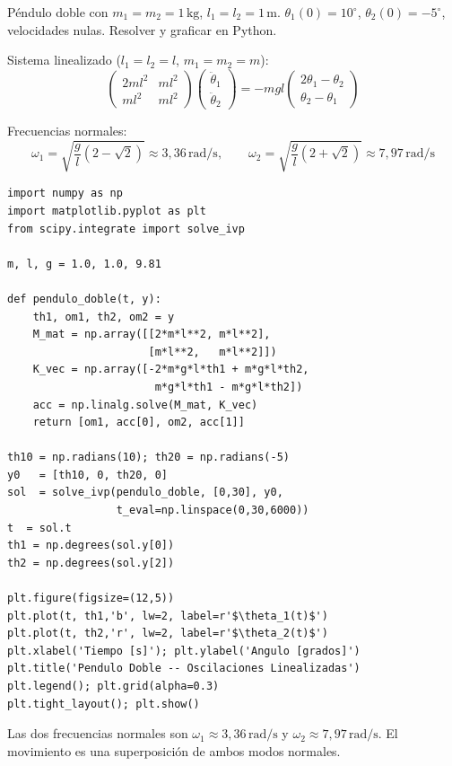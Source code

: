 \documentclass[12pt, a4paper, oneside]{book}
\newcommand{\rad}{\,\text{rad/s}}
\newcommand{\kg}{\,\text{kg}}
\newcommand{\mts}{\,\text{m}}
\begin{document}
\begin{problema}[title={Problema~36 --- P\'endulo doble}]
P\'endulo doble con $m_{1} = m_{2} = 1\kg$, $l_{1} = l_{2} = 1\mts$.
$\theta_{1}(0) = 10^\circ$, $\theta_{2}(0) = -5^\circ$, velocidades nulas.
Resolver y graficar en Python.
\end{problema}

\begin{solucion}
Sistema linealizado ($l_{1}=l_{2}=l$, $m_{1}=m_{2}=m$):
\[
  \begin{pmatrix} 2ml^{2} & ml^{2} \\ ml^{2} & ml^{2} \end{pmatrix}
  \begin{pmatrix}\ddot\theta_{1}\\\ddot\theta_{2}\end{pmatrix}
  = -mgl\begin{pmatrix}2\theta_{1}-\theta_{2}\\\theta_{2}-\theta_{1}\end{pmatrix}
\]

Frecuencias normales:
\[
  \omega_{1} = \sqrt{\dfrac{g}{l}(2-\sqrt{2})} \approx 3{,}36\rad,\qquad
  \omega_{2} = \sqrt{\dfrac{g}{l}(2+\sqrt{2})} \approx 7{,}97\rad
\]

\begin{lstlisting}[caption={P\'endulo doble linealizado --- Problema 36}]
import numpy as np
import matplotlib.pyplot as plt
from scipy.integrate import solve_ivp

m, l, g = 1.0, 1.0, 9.81

def pendulo_doble(t, y):
    th1, om1, th2, om2 = y
    M_mat = np.array([[2*m*l**2, m*l**2],
                      [m*l**2,   m*l**2]])
    K_vec = np.array([-2*m*g*l*th1 + m*g*l*th2,
                       m*g*l*th1 - m*g*l*th2])
    acc = np.linalg.solve(M_mat, K_vec)
    return [om1, acc[0], om2, acc[1]]

th10 = np.radians(10); th20 = np.radians(-5)
y0   = [th10, 0, th20, 0]
sol  = solve_ivp(pendulo_doble, [0,30], y0,
                 t_eval=np.linspace(0,30,6000))
t  = sol.t
th1 = np.degrees(sol.y[0])
th2 = np.degrees(sol.y[2])

plt.figure(figsize=(12,5))
plt.plot(t, th1,'b', lw=2, label=r'$\theta_1(t)$')
plt.plot(t, th2,'r', lw=2, label=r'$\theta_2(t)$')
plt.xlabel('Tiempo [s]'); plt.ylabel('Angulo [grados]')
plt.title('Pendulo Doble -- Oscilaciones Linealizadas')
plt.legend(); plt.grid(alpha=0.3)
plt.tight_layout(); plt.show()
\end{lstlisting}

\begin{resultado}
Las dos frecuencias normales son $\omega_{1} \approx 3{,}36\rad$ y
$\omega_{2} \approx 7{,}97\rad$. El movimiento es una superposici\'on de
ambos modos normales.
\end{resultado}
\end{solucion}
\end{document}
